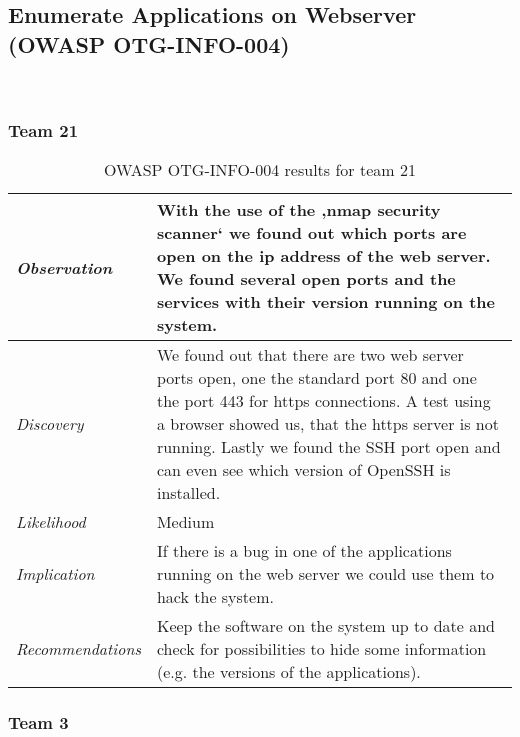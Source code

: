 \documentclass[headsepline,footsepline,footinclude=false,oneside,fontsize=11pt,paper=a4,listof=totoc,bibliography=totoc]{scrbook} %
\begin{document}
\subsection{Enumerate Applications on Webserver (OWASP OTG-INFO-004)}\
\pagebreak 

\subsubsection{Team 21}

\begin{table}[H]
\centering
 \begin{tabular}{l p{11cm}} 
 \textit{Observation} & With the use of the ‚nmap security scanner‘ we found out which ports are open on the ip address of the web server. We found several open ports and the services with their version running on the system.\\ 
 \hline
 \textit{Discovery} & We found out that there are two web server ports open, one the standard port 80 and one the port 443 for https connections. A test using a browser showed us, that the https server is not running. Lastly we found the SSH port open and can even see which version of OpenSSH is installed. \\
 \hline
 \textit{Likelihood} & Medium\\
 \hline
 \textit{Implication} & If there is a bug in one of the applications running on the web server we could use them to hack the system.\\
 \hline
 \textit{Recommendations} & Keep the software on the system up to date and check for possibilities to hide some information (e.g. the versions of the applications). \\ 
\end{tabular}
\caption{OWASP OTG-INFO-004 results for team 21}
\label{table:scenario2}
\end{table}

\subsubsection{Team 3}
\end{document}
